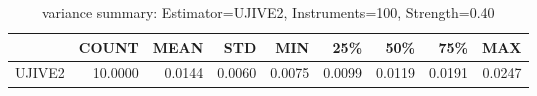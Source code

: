 \begin{table}[ht]
\centering
\caption{variance summary: Estimator=UJIVE2, Instruments=100, Strength=0.40}
\begin{tabular}{lrrrrrrrr}
\toprule
 & COUNT & MEAN & STD & MIN & 25\% & 50\% & 75\% & MAX \\
\midrule
UJIVE2 & 10.0000 & 0.0144 & 0.0060 & 0.0075 & 0.0099 & 0.0119 & 0.0191 & 0.0247 \\
\bottomrule
\end{tabular}
\end{table}
